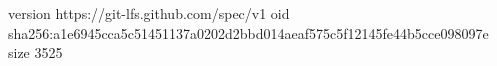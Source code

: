 version https://git-lfs.github.com/spec/v1
oid sha256:a1e6945cca5c51451137a0202d2bbd014aeaf575c5f12145fe44b5cce098097e
size 3525
